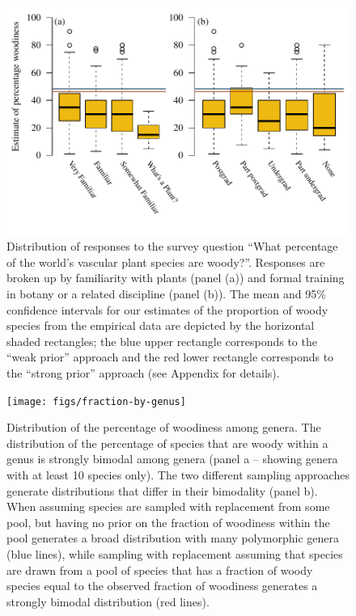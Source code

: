 \documentclass[a4paper,12pt]{article}
\begin{document}




\begin{figure}[p]
  \centering
  \includegraphics{figs/survey-results}
  \caption{Distribution of responses to the survey question ``What
    percentage of the world's vascular plant species are
    woody?''. Responses are broken up by familiarity with plants
    (panel (a)) and formal training in botany or a related discipline
    (panel (b)). The mean and 95\% confidence intervals for our
    estimates of the proportion of woody species from the empirical
    data are depicted by the horizontal shaded rectangles; the blue
    upper rectangle corresponds to the ``weak prior'' approach and the
    red lower rectangle corresponds to the ``strong prior'' approach
    (see Appendix for details).}
  \label{fig:survey}
\end{figure}

\begin{figure}[p]
  \centering
  \texttt{[image: figs/fraction-by-genus]}
  \caption{Distribution of the percentage of woodiness among genera.
    The distribution of the percentage of species that are woody within
    a genus is strongly bimodal among genera (panel a -- showing
    genera with at least 10 species only).
    The two different sampling approaches generate distributions that
    differ in their bimodality (panel b). When assuming species are
    sampled with replacement from some pool, but having no prior on
    the fraction of woodiness within the pool generates a broad
    distribution with many polymorphic genera (blue lines), while
    sampling with replacement assuming that species are drawn from a
    pool of species that has a fraction of woody species equal to the
    observed fraction of woodiness generates a strongly bimodal
    distribution (red lines).}
  \label{fig:distribution-genera}
\end{figure}
\end{document}
